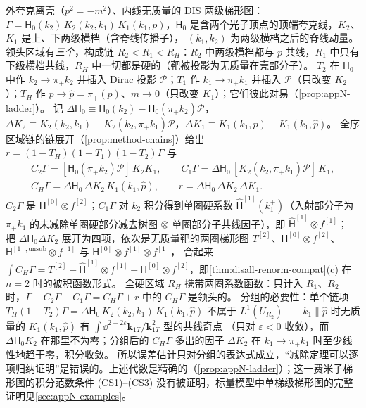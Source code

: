 \begin{example}\label{ex:disall-ladder}
外夸克离壳（$p^2=-m^2$）、内线无质量的 DIS 两级梯形图：$\Gamma=\mathsf H_0(k_2)\,K_2(k_2,k_1)\,K_1(k_1,p)$，$\mathsf H_0$ 是含两个光子顶点的顶端夸克线，$K_2$、$K_1$ 是上、下两级横档（含脊线传播子），
$(k_1,k_2)$ 为两级横档之后的脊线动量。领头区域有\emph{三个}，构成链 $R_2<R_1<R_H$：$R_2$ 中两级横档都与 $p$ 共线，$R_1$ 中只有下级横档共线，$R_H$ 中一切都是硬的（靶被投影为无质量在壳部分子）。
$T_2$ 在 $\mathsf H_0$ 中作 $k_2\to\pi_+k_2$ 并插入 Dirac 投影 $\mathcal P$；$T_1$ 作 $k_1\to\pi_+k_1$ 并插入 $\mathcal P$（只改变 $K_2$）；$T_H$ 作 $p\to\hat p=\pi_+(p)$、$m\to0$（只改变 $K_1$）；它们彼此对易（\cref{prop:appN-ladder}）。
记 $\Delta\mathsf H_0\equiv\mathsf H_0(k_2)-\mathsf H_0(\pi_+k_2)\mathcal P$，$\Delta K_2\equiv K_2(k_2,k_1)-K_2(k_2,\pi_+k_1)\mathcal P$，$\Delta K_1\equiv K_1(k_1,p)-K_1(k_1,\hat p)$。
全序区域链的链展开（\cref{prop:method-chains}）给出 $r=(1-T_H)(1-T_1)(1-T_2)\Gamma$ 与
\begin{equation}\label{eq:disall-ladder}
\begin{gathered}
C_2\Gamma=[\mathsf H_0(\pi_+k_2)\mathcal P]\,K_2K_1,\qquad C_1\Gamma=\Delta\mathsf H_0\,[K_2(k_2,\pi_+k_1)\mathcal P]\,K_1,\\
C_H\Gamma=\Delta\mathsf H_0\,\Delta K_2\,K_1(k_1,\hat p),\qquad r=\Delta\mathsf H_0\,\Delta K_2\,\Delta K_1 .
\end{gathered}
\end{equation}
$C_2\Gamma$ 是 $\mathsf H^{[0]}\otimes f^{[2]}$；$C_1\Gamma$ 对 $k_2$ 积分得到单圈硬系数 $\hat{\mathsf H}^{[1]}(k_1^+)$（入射部分子为 $\pi_+k_1$ 的未减除单圈硬部分减去树图 $\otimes$ 单圈部分子共线因子），即 $\hat{\mathsf H}^{[1]}\otimes f^{[1]}$；
把 $\Delta\mathsf H_0\Delta K_2$ 展开为四项，依次是无质量靶的两圈梯形图 $T^{[2]}$、$\mathsf H^{[0]}\otimes f^{[2]}$、$\mathsf H^{[1],\mathrm{unsub}}\otimes f^{[1]}$ 与 $\mathsf H^{[0]}\otimes f^{[1]}\otimes f^{[1]}$，
合起来 $\int C_H\Gamma=T^{[2]}-\hat{\mathsf H}^{[1]}\otimes f^{[1]}-\mathsf H^{[0]}\otimes f^{[2]}$，即\cref{thm:disall-renorm-compat}(c) 在 $n=2$ 时的被积函数形式。
全硬区域 $R_H$ 携带两圈系数函数：只计入 $R_1$、$R_2$ 时，$\Gamma-C_2\Gamma-C_1\Gamma=C_H\Gamma+r$ 中的 $C_H\Gamma$ 是领头的。
分组的必要性：单个链项 $T_H(1-T_2)\Gamma=\Delta\mathsf H_0\,K_2(k_2,k_1)\,K_1(k_1,\hat p)$ 不属于 $L^1(U_{R_2})$——$k_1\parallel\hat p$ 时无质量的 $K_1(k_1,\hat p)$ 有 $\int\dd^{2-2\varepsilon}\mathbf k_{1T}/\mathbf k_{1T}^2$ 型的共线奇点
（只对 $\varepsilon<0$ 收敛），而 $\Delta\mathsf H_0K_2$ 在那里不为零；分组后的 $C_H\Gamma$ 多出的因子 $\Delta K_2$ 在 $k_1\to\pi_+k_1$ 时至少线性地趋于零，积分收敛。
所以误差估计只对分组的表达式成立，“减除定理可以逐项归纳证明”是错误的。上述代数是精确的（\cref{prop:appN-ladder}）；这一费米子梯形图的积分范数条件 (CS1)–(CS3) 没有被证明，标量模型中单梯级梯形图的完整证明见\cref{sec:appN-examples}。
\end{example}


